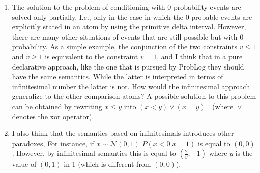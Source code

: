 \begin{enumerate}

\item The solution to the problem of conditioning with $0$-probability events are
solved only partially. I.e., only in the case in which the $0$ probable events
are explicitly stated in an atom by using the primitive delta interval.
However, there are many other situations of events that are still possible
but with $0$ probability. As a simple example, the conjunction of the two
constraints $v \leq 1$ and $v \geq 1$ is equivalent to the constraint $v = 1$, and
I think that in a pure declarative approach, like the one that is pursued
by ProbLog they should have the same semantics. While the latter is
interpreted in terms of infinitesimal number the latter is not. How would
the infinitesimal approach generalize to the other comparison atoms? A
possible solution to this problem can be obtained by rewriting $x \leq y$ into
$(x < y ) \overline{\vee} (x=y)$
˙ (where $ \overline{\vee}$ denotes the xor operator).


\item I also think that the semantics based on infinitesimals introduces other
paradoxes, For instance, if $x \sim \mathcal{N} (0, 1)$ $P (x < 0 | x = 1)$ is equal to $(0, 0)$.
However, by infinitesimal semantics this is equal to $( \frac{2}{y}
, -1)$ where $y$ is
the value of $(0, 1)$ in 1 (which is different from $(0, 0)$).

\end{enumerate}
